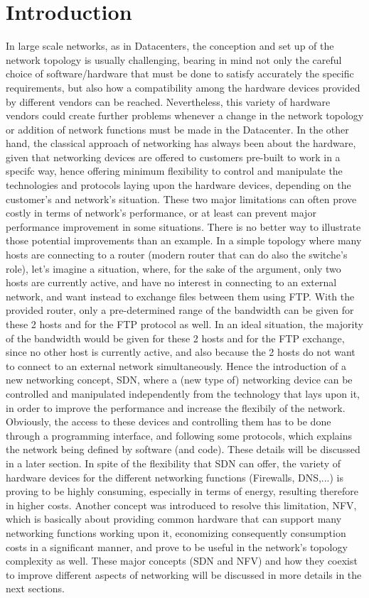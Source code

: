 \section{Introduction}
In large scale networks, as in Datacenters, the conception and set up of the network topology is usually challenging, bearing in mind not only the careful choice of software/hardware that must be done to satisfy accurately the specific requirements, but also how a compatibility among the hardware devices provided by different vendors can be reached. Nevertheless, this variety of hardware vendors could create further problems whenever a change in the network topology or addition of network functions must be made in the Datacenter. In the other hand, the classical approach of networking has always been about the hardware, given that networking devices are offered to customers pre-built to work in a specifc way, hence offering minimum flexibility to control and manipulate the technologies and protocols laying upon the hardware devices, depending on the customer’s and network’s situation. These two major limitations can often prove costly in terms of network’s performance, or at least can prevent major performance improvement in some situations. There is no better way to illustrate those potential improvements than an example. In a simple topology where many hosts are connecting to a router (modern router that can do also the switche’s role), let’s imagine a situation, where, for the sake of the argument, only two hosts are currently active, and have no interest in connecting to an external network, and want instead to exchange files between them using FTP. With the provided router, only a pre-determined range of the bandwidth can be given for these 2 hosts and for the FTP protocol as well. In an ideal situation, the majority of the bandwidth would be given for these 2 hosts and for the FTP exchange, since no other host is currently active, and also because the 2 hosts do not want to connect to an external network simultaneously. Hence the introduction of a new networking concept, SDN, where a (new type of) networking device can be controlled and manipulated independently from the technology that lays upon it, in order to improve the performance and increase the flexibily of the network. Obviously, the access to these devices and controlling them has to be done through a programming interface, and following some protocols, which explains the network being defined by software (and code). These details will be discussed in a later section. In spite of the flexibility that SDN can offer, the variety of hardware devices for the different networking functions (Firewalls, DNS,...) is proving to be highly consuming, especially in terms of energy, resulting therefore in higher costs. Another concept was introduced to resolve this limitation, NFV, which is basically about providing common hardware that can support many networking functions working upon it, economizing consequently consumption costs in a significant manner, and prove to be useful in the network’s topology complexity as well. These major concepts (SDN and NFV) and how they coexist to improve different aspects of networking will be discussed in more details in the next sections.
\newpage

